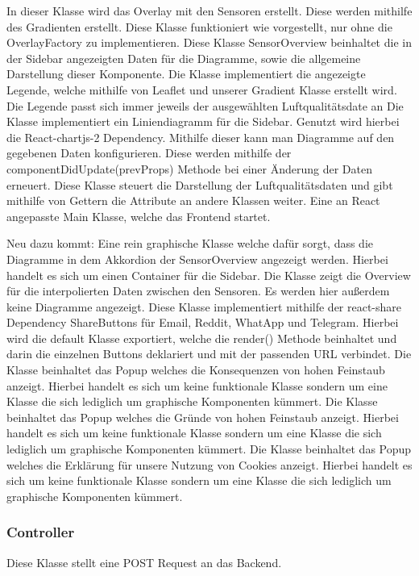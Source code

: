     \removedClass
{}
    In dieser Klasse wird das Overlay mit den Sensoren erstellt. Diese werden mithilfe des Gradienten erstellt.
    Diese Klasse funktioniert wie vorgestellt, nur ohne die OverlayFactory zu implementieren.
    Diese Klasse SensorOverview beinhaltet die in der Sidebar angezeigten Daten für die Diagramme, sowie die allgemeine Darstellung dieser Komponente.
    Die Klasse implementiert die angezeigte Legende, welche mithilfe von \gls{Leaflet} und unserer Gradient Klasse erstellt wird.
    Die Legende passt sich immer jeweils der ausgewählten Luftqualitätsdate an
    Die Klasse implementiert ein Liniendiagramm für die Sidebar. Genutzt wird hierbei die React-chartjs-2 Dependency.
    Mithilfe dieser kann man Diagramme auf den gegebenen Daten konfigurieren. Diese werden mithilfe der componentDidUpdate(prevProps) Methode
    bei einer Änderung der Daten erneuert.
    \removedClass
{}
    \removedClass
{}
    Diese Klasse steuert die Darstellung der Luftqualitätsdaten und gibt mithilfe von Gettern die Attribute an andere Klassen weiter.
    Eine an React angepasste Main Klasse, welche das Frontend startet.

Neu dazu kommt:
    Eine rein graphische Klasse welche dafür sorgt, dass die Diagramme in dem Akkordion der SensorOverview angezeigt werden.
    Hierbei handelt es sich um einen Container für die Sidebar.
    Die Klasse zeigt die Overview für die interpolierten Daten zwischen den Sensoren. Es werden hier außerdem keine Diagramme angezeigt.
    Diese Klasse implementiert mithilfe der react-share Dependency ShareButtons für Email, Reddit, WhatApp und Telegram.
    Hierbei wird die default Klasse exportiert, welche die render() Methode beinhaltet und darin die einzelnen Buttons deklariert und 
    mit der passenden URL verbindet.
    Die Klasse beinhaltet das Popup welches die Konsequenzen von hohen Feinstaub anzeigt. Hierbei handelt es sich um keine funktionale Klasse sondern um eine Klasse die sich
    lediglich um graphische Komponenten kümmert.
    Die Klasse beinhaltet das Popup welches die Gründe von hohen Feinstaub anzeigt. Hierbei handelt es sich um keine funktionale Klasse sondern um eine Klasse die sich
    lediglich um graphische Komponenten kümmert.
    Die Klasse beinhaltet das Popup welches die Erklärung für unsere Nutzung von \gls{Cookie}s anzeigt. Hierbei handelt es sich um keine funktionale Klasse sondern um eine Klasse die sich
    lediglich um graphische Komponenten kümmert.

\subsubsection{Controller}
    Diese Klasse stellt eine POST Request an das Backend.